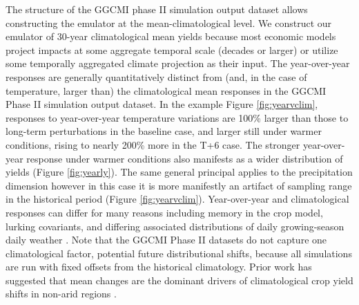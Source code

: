 \documentclass[gmd, manuscript]{copernicus} %
\begin{document}
The structure of the GGCMI phase II simulation output dataset allows constructing the emulator at the mean-climatological level.
We construct our emulator of 30-year climatological mean yields because most economic models project impacts at some aggregate temporal scale (decades or larger) or utilize some temporally aggregated climate projection as their input.
The year-over-year responses are generally quantitatively distinct from (and, in the case of temperature, larger than) the climatological mean responses in the GGCMI Phase II simulation output dataset. 
In the example Figure \ref{fig:yearvclim}, responses to year-over-year temperature variations are 100\% larger than those to long-term perturbations in the baseline case, and larger still under warmer conditions, rising to nearly 200\% more in the T+6 case. 
The stronger year-over-year response under warmer conditions also manifests as a wider distribution of yields (Figure \ref{fig:yearly}).
The same general principal applies to the precipitation dimension however in this case it is more manifestly an artifact of sampling range in the historical period (Figure \ref{fig:yearvclim}).
Year-over-year and climatological responses can differ for many reasons including memory in the crop model, lurking covariants, and differing associated distributions of daily growing-season daily weather \citep[e.g.][]{Ruane2016}. 
Note that the GGCMI Phase II datasets do not capture one climatological factor, potential future distributional shifts, because all simulations are run with fixed offsets from the historical climatology. 
Prior work has suggested that mean changes are the dominant drivers of climatological crop yield shifts in non-arid regions \citep[e.g.][]{Glotter14}. 
\end{document}
